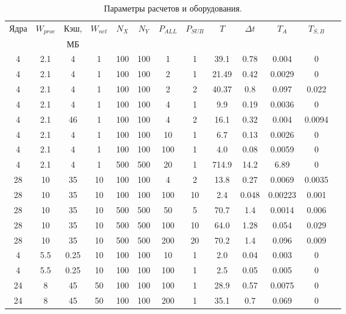 \begin{center}
	\begin{table}[ht]
		\caption{Параметры расчетов и оборудования.}
		\begin{tabular}{|c|c|c|c|c|c|c|c|c|c|c|c|c|}
			\hline			
			Ядра & $W_{proc}$& Кэш,  &$W_{net}$  & $N_X$ & $N_Y$ & $P_{ALL}$  & $P_{SUB}$ & $T$ & $\Delta t$ & $T_{A}$ &  $T_{S,B}$ \\
			     &           & МБ    &           &       &       &           &           &     & & & \\ \hline  
			 4 & 2.1 & 4 & 1     & 100   & 100   &  1        & 1         & 39.1  & 0.78 & 0.004         & 0         \\\hline
			 4 & 2.1 & 4 &  1     & 100   & 100      &  2        & 1         & 21.49 & 0.42 & 0.0029         & 0         \\\hline
			 4 & 2.1 & 4 & 1     & 100   & 100       &  2        & 2         & 40.37 & 0.8 & 0.097         & 0.022       \\\hline
			 4& 2.1& 4 &1     & 100   & 100       &  4        & 1         & 9.9 & 0.19 & 0.0036         & 0           \\\hline
			 4 & 2.1 & 46&1     & 100   & 100      &  4        & 2         & 16.1 & 0.32 & 0.004         & 0.0094      \\\hline
			4 & 2.1& 4&1     & 100   & 100       &  10       & 1         & 6.7 & 0.13 & 0.0026         & 0           \\\hline
			4 & 2.1& 4 &1     & 100   & 100       &  100      & 1         & 4.0   & 0.08 & 0.0059         & 0         \\ \hline
			4 & 2.1 & 4 &1     & 500   & 500   & 20          & 1         & 714.9 & 14.2 & 6.89         & 0           \\\hline
			28& 10 & 35&10 & 100   & 100       &  4       & 2         & 13.8 & 0.27 & 0.0069  & 0.0035      \\\hline
			28 &10 & 35&10 & 100   & 100       &  100     & 10        & 2.4 & 0.048 & 0.00223 & 0.001       \\\hline
			28 &10 & 35 &10 & 500   & 500       &  50       & 5        & 70.7 & 1.4 & 0.0014   & 0.006       \\\hline
			28 & 10 & 35 & 10 & 500   & 500     &  100       & 10      & 64.0 & 1.28 & 0.054   & 0.029       \\\hline
			28 & 10& 35&10 & 500   & 500       &  200       & 20      & 70.2 & 1.4 & 0.096    & 0.009      \\\hline
			4 & 5.5 & 0.25 & 10 & 100   & 100       &  10       & 1         & 2.0 & 0.04 & 0.003    & 0           \\\hline
			4 & 5.5 & 0.25 & 10 & 100   & 100       &  100       & 1        & 2.5 & 0.05 & 0.005    & 0           \\\hline
			24 & 8 & 45& 50        & 100   & 100      &  100       & 1        & 28.9 & 0.57 & 0.0075  & 0           \\\hline
			24 & 8 & 45 & 50        & 100   & 100      &  200       & 1        & 35.1 & 0.7 & 0.069    & 0           \\\hline
			

\end{tabular}
\end{table}
\end{center}
